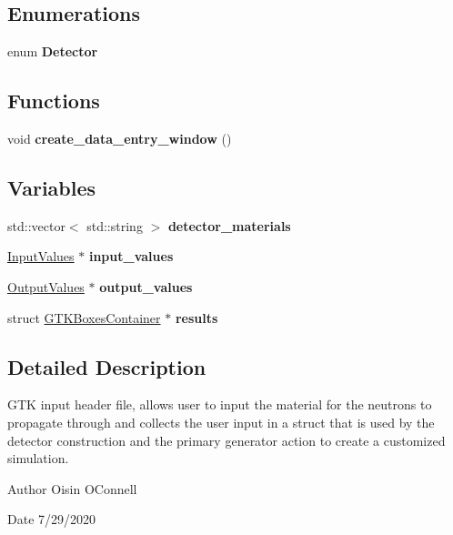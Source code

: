 \subsection*{Enumerations}
\begin{DoxyCompactItemize}
\item 
\mbox{\label{GTKInput_8hh_a2331baf03bacdf22d5763e6ce3329e2f}} 
enum {\bfseries Detector} 
\end{DoxyCompactItemize}
\subsection*{Functions}
\begin{DoxyCompactItemize}
\item 
\mbox{\label{GTKInput_8hh_a19f5912b30e5d38df0a3c0bfa9b794f2}} 
void {\bfseries create\+\_\+data\+\_\+entry\+\_\+window} ()
\end{DoxyCompactItemize}
\subsection*{Variables}
\begin{DoxyCompactItemize}
\item 
\mbox{\label{GTKInput_8hh_aefb2ae95fdd6ed4de4ff76a886180f24}} 
std\+::vector$<$ std\+::string $>$ {\bfseries detector\+\_\+materials}
\item 
\mbox{\label{GTKInput_8hh_a69055fa214854d483b97260a00cbfa60}} 
\hyperlink{classInputValues}{Input\+Values} $\ast$ {\bfseries input\+\_\+values}
\item 
\mbox{\label{GTKInput_8hh_af802813aa13c8a2d9a86f12dc49d5c92}} 
\hyperlink{classOutputValues}{Output\+Values} $\ast$ {\bfseries output\+\_\+values}
\item 
\mbox{\label{GTKInput_8hh_a9af02616a624ef7c34dee19b71e0bf32}} 
struct \hyperlink{structGTKBoxesContainer}{G\+T\+K\+Boxes\+Container} $\ast$ {\bfseries results}
\end{DoxyCompactItemize}


\subsection{Detailed Description}
G\+TK input header file, allows user to input the material for the neutrons to propagate through and collects the user input in a struct that is used by the detector construction and the primary generator action to create a customized simulation. 

\begin{DoxyAuthor}{Author}
Oisin O\textquotesingle{}Connell 
\end{DoxyAuthor}
\begin{DoxyDate}{Date}
7/29/2020 
\end{DoxyDate}
